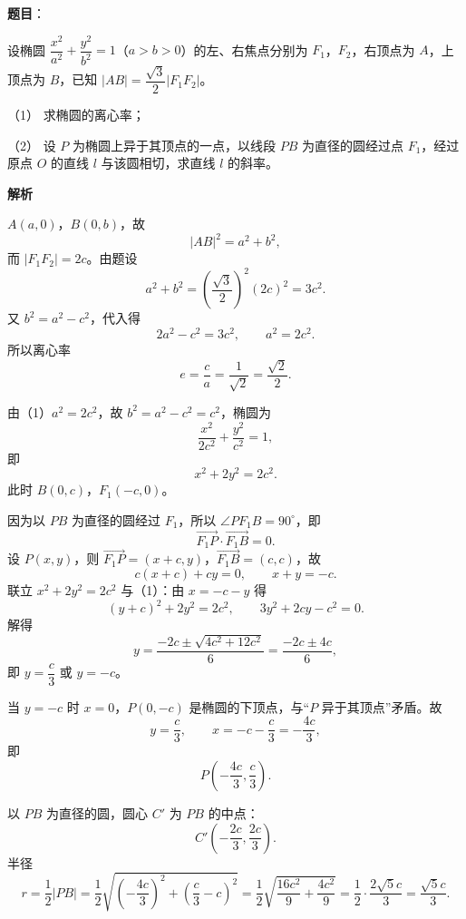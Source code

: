 \begin{answer}

\textbf{题目}：

设椭圆 $\dfrac{x^2}{a^2}+\dfrac{y^2}{b^2}=1$（$a>b>0$）的左、右焦点分别为 $F_1$，$F_2$，右顶点为 $A$，上顶点为 $B$，已知 $|AB|=\dfrac{\sqrt3}{2}|F_1F_2|$。

（1） 求椭圆的离心率；

（2） 设 $P$ 为椭圆上异于其顶点的一点，以线段 $PB$ 为直径的圆经过点 $F_1$，经过原点 $O$ 的直线 $l$ 与该圆相切，求直线 $l$ 的斜率。

\textbf{解析}


$A(a,0)$，$B(0,b)$，故
\nopagebreak[4]
\[|AB|^2=a^2+b^2,\]
而 $|F_1F_2|=2c$。由题设
\nopagebreak[4]
\[a^2+b^2=\left(\frac{\sqrt3}{2}\right)^2(2c)^2=3c^2.\]
又 $b^2=a^2-c^2$，代入得
\nopagebreak[4]
\[2a^2-c^2=3c^2,\qquad a^2=2c^2.\]
所以离心率
\nopagebreak[4]
\[e=\frac ca=\frac1{\sqrt2}=\frac{\sqrt2}{2}.\]


由（1）$a^2=2c^2$，故 $b^2=a^2-c^2=c^2$，椭圆为
\nopagebreak[4]
\[\frac{x^2}{2c^2}+\frac{y^2}{c^2}=1,\]
即
\nopagebreak[4]
\[x^2+2y^2=2c^2.\]
此时 $B(0,c)$，$F_1(-c,0)$。

因为以 $PB$ 为直径的圆经过 $F_1$，所以 $\angle PF_1B=90^\circ$，即
\nopagebreak[4]
\[\overrightarrow{F_1P}\cdot\overrightarrow{F_1B}=0.\]
设 $P(x,y)$，则 $\overrightarrow{F_1P}=(x+c,y)$，$\overrightarrow{F_1B}=(c,c)$，故
\nopagebreak[4]
\[c(x+c)+cy=0,\qquad x+y=-c. \tag{1}\]
联立 $x^2+2y^2=2c^2$ 与（1）：由 $x=-c-y$ 得
\nopagebreak[4]
\[(y+c)^2+2y^2=2c^2,\qquad 3y^2+2cy-c^2=0.\]
解得
\nopagebreak[4]
\[y=\frac{-2c\pm\sqrt{4c^2+12c^2}}{6}=\frac{-2c\pm4c}{6},\]
即 $y=\dfrac c3$ 或 $y=-c$。

当 $y=-c$ 时 $x=0$，$P(0,-c)$ 是椭圆的下顶点，与“$P$ 异于其顶点”矛盾。故
\nopagebreak[4]
\[y=\frac c3,\qquad x=-c-\frac c3=-\frac{4c}{3},\]
即
\nopagebreak[4]
\[P\left(-\frac{4c}{3},\frac c3\right).\]

以 $PB$ 为直径的圆，圆心 $C'$ 为 $PB$ 的中点：
\nopagebreak[4]
\[C'\left(-\frac{2c}{3},\frac{2c}{3}\right).\]
半径
\nopagebreak[4]
\[r=\frac12|PB|=\frac12\sqrt{\left(-\frac{4c}{3}\right)^2+\left(\frac c3-c\right)^2}
=\frac12\sqrt{\frac{16c^2}{9}+\frac{4c^2}{9}}
=\frac12\cdot\frac{2\sqrt5c}{3}=\frac{\sqrt5c}{3}.\]


\end{answer}
